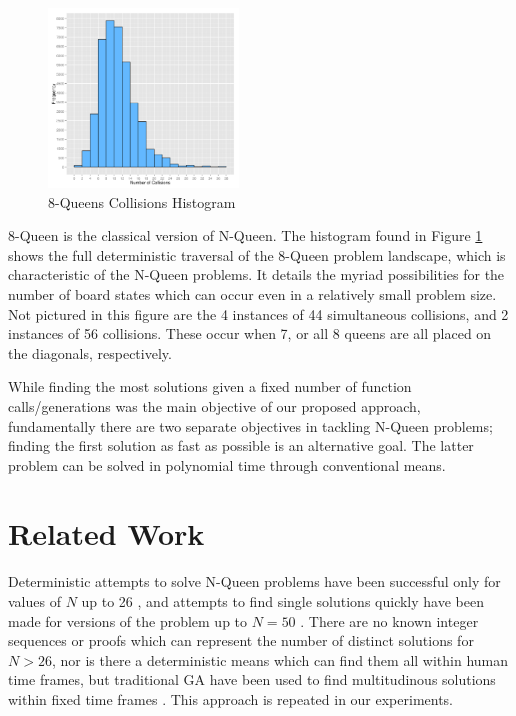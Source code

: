 \documentclass[conference]{IEEEtran}
\begin{document}
\begin{figure}[h!]\label{fig:histogram}
\centering
\includegraphics[width=0.45\textwidth]{8_queens_histogram.png}
\vspace{-12pt}
\caption{8-Queens Collisions Histogram}
\end{figure}

8-Queen is the classical version of N-Queen. The histogram found in Figure \ref{fig:histogram} shows the full deterministic traversal of the 8-Queen problem landscape, which is characteristic of the N-Queen problems. It details the myriad possibilities for the number of board states which can occur even in a relatively small problem size. Not pictured in this figure are the 4 instances of 44 simultaneous collisions, and 2 instances of 56 collisions. These occur when 7, or all 8 queens are all placed on the diagonals, respectively. 

While finding the most solutions given a fixed number of function calls/generations was the main objective of our proposed approach, fundamentally there are two separate objectives in tackling N-Queen problems; finding the first solution as fast as possible is an alternative goal. The latter problem can be solved in polynomial time through conventional means.

\section{Related Work}
Deterministic attempts to solve N-Queen problems have been successful only for values of $N$ up to 26 \cite{cit:20}, and attempts to find single solutions quickly have been made for versions of the problem up to {$N = 50$} \cite{cit:21}. There are no known integer sequences or proofs which can represent the number of distinct solutions for $N > 26$, nor is there a deterministic means which can find them all within human time frames, but traditional GA have been used to find multitudinous solutions within fixed time frames \cite{cit:9,cit:10}. This approach is repeated in our experiments.
\end{document}
